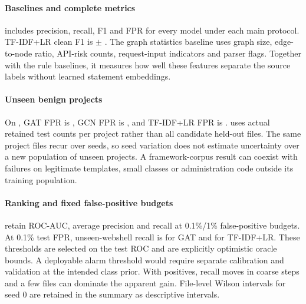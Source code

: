 \paragraph{Baselines and complete metrics}
 includes precision, recall, F1 and FPR for every model under each main protocol.
TF-IDF+LR clean F1 is  $\pm$ .
The graph statistics baseline uses graph size, edge-to-node ratio, API-risk counts, request-input indicators
and parser flags. Together with the rule baselines, it measures how well these features separate the source
labels without learned statement embeddings.

\begin{table}[!t]\centering\scriptsize
\caption{Complete v2 main-protocol comparison: mean $\pm$ 95\% seed interval, five seeds.
Positive class: source-labelled webshell. FPR uses benign test files only.}\label{tab:protocols}
\begin{fittable}\end{fittable}
\end{table}

\paragraph{Unseen benign projects}
On \xs, GAT FPR is , GCN FPR is , and
TF-IDF+LR FPR is .  uses actual retained test counts per
project rather than all candidate held-out files. The same project files recur over seeds, so seed variation
does not estimate uncertainty over a new population of unseen projects. A framework-corpus result can coexist
with failures on legitimate templates, small classes or administration code outside its training population.

\begin{table}[!t]\centering\footnotesize
\caption{V2 FPR per unseen benign project; counts refer to the actual \xs{} test cohort.}\label{tab:perproject}
\begin{fittable}\end{fittable}
\end{table}

\paragraph{Ranking and fixed false-positive budgets}
 retain ROC-AUC, average precision and recall at 0.1\%/1\% false-positive budgets.
At 0.1\% test FPR, unseen-webshell recall is  for GAT and
 for TF-IDF+LR.
These thresholds are selected on the test ROC and are explicitly optimistic oracle bounds.
A deployable alarm threshold would require separate calibration and validation at the intended class prior.
With  positives, recall moves in coarse steps and a few files can dominate
the apparent gain. File-level Wilson intervals for seed 0 are retained in the summary as descriptive intervals.

